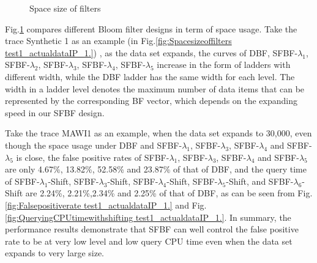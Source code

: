 \documentclass[10pt,journal,letterpaper]{IEEEtran}
\begin{document}
\begin{figure}[!htb]
{\label{fig:Spacesizeoffilters test1 actualdata webcache 1.}}
\caption{Space size of filters}
\label{fig:Space size of filters.}
\end{figure}



Fig.\ref{fig:Space size of filters.} compares different Bloom filter designs in term of space usage.
Take the trace Synthetic 1 as an example (in Fig.\ref{fig:Spacesizeoffilters test1_actualdataIP_1.}) , as the data set expands, the curves of DBF, SFBF-$\lambda_1$, SFBF-$\lambda_2$, SFBF-$\lambda_3$, SFBF-$\lambda_4$, SFBF-$\lambda_5$ increase in the form of ladders with different width, while the DBF ladder has the same width for each level.
The width in a ladder level denotes the maximum number of data items that can be represented by the corresponding BF vector, which depends on the expanding speed in our SFBF design.

Take the trace MAWI1 as an example, when the data set expands to 30,000, even though the space usage under DBF and SFBF-$\lambda_1$,  SFBF-$\lambda_3$, SFBF-$\lambda_4$ and SFBF-$\lambda_5$ is close, the false positive rates of SFBF-$\lambda_1$,  SFBF-$\lambda_3$, SFBF-$\lambda_4$ and SFBF-$\lambda_5$ are only 4.67\%,  13.82\%, 52.58\% and 23.87\% of that of DBF, and the query time of SFBF-$\lambda_1$-Shift,  SFBF-$\lambda_3$-Shift, SFBF-$\lambda_4$-Shift, SFBF-$\lambda_5$-Shift, and SFBF-$\lambda_6$-Shift are 2.24\%, 2.21\%,2.34\% and 2.25\% of that of DBF, as can be seen from Fig.\ref{fig:Falsepositiverate test1_actualdataIP_1.} and Fig.\ref{fig:QueryingCPUtimewithshifting test1_actualdataIP_1.}.
In summary, the performance results demonstrate that SFBF can well control the false positive rate to be at very low level and low query CPU time even when the data set expands to very large size.
\end{document}
